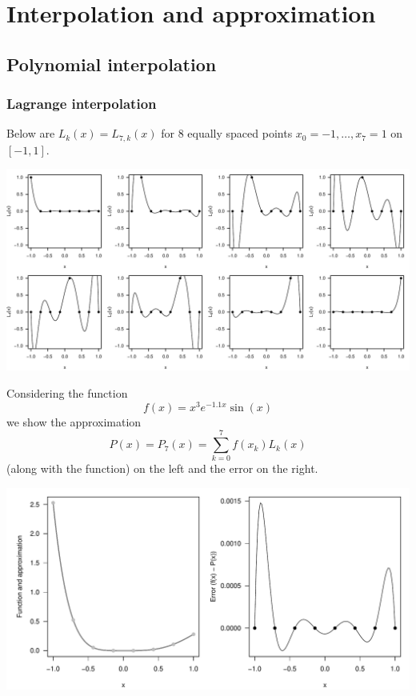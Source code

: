 \documentclass[11pt]{article}
\begin{document}
\clearpage
\section{Interpolation and approximation}
\subsection{Polynomial interpolation}
\subsubsection{Lagrange interpolation}
Below are \(L_k(x) = L_{7, k}(x)\) for \(8\) equally spaced points \(x_0 = -1, \dots, x_7 = 1\) on \([-1, 1]\). 

\includegraphics[width=\textwidth]{2_interpolation/Li.pdf}

Considering the function \[f(x) = x^3e^{-1.1x}\sin(x)\] we show the approximation \[P(x) = P_7(x) = \sum_{k=0}^7 f(x_k)L_k(x)\] (along with the function) on the left and the error on the right.

\includegraphics[width=\textwidth]{2_interpolation/fP.pdf}

\end{document}
